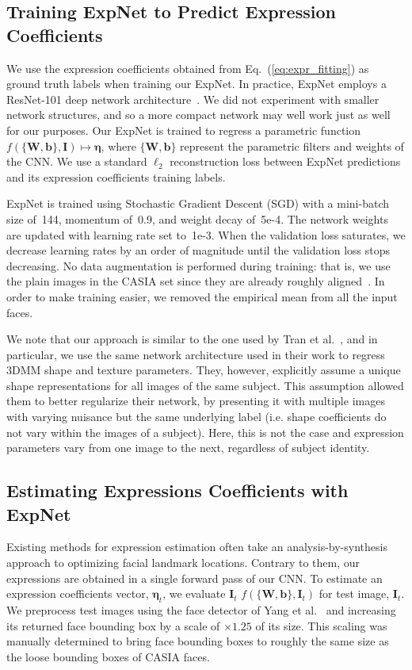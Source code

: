 \documentclass[a4paper, 10pt, conference]{ieeeconf}
\def\mbf#1{\mathbf{#1}}
\begin{document}
\subsection{Training ExpNet to Predict Expression Coefficients}\label{sec:training}
We use the expression coefficients obtained from Eq.~(\ref{eq:expr_fitting}) as ground truth labels when training our ExpNet. In practice, ExpNet employs a ResNet-101 deep network architecture~\cite{He_2016_CVPR}. We did not experiment with smaller network structures, and so a more compact network may well work just as well for our purposes. Our ExpNet is trained to regress a parametric function $f(\{\mbf{W},\mbf{b}\}, \mbf{I}) \mapsto \boldsymbol{\eta}$, where $\{\mbf{W},\mbf{b}\}$ represent the parametric filters and weights of the CNN. We use a standard $\ell_2$ reconstruction loss between ExpNet predictions and its expression coefficients training labels.

ExpNet is trained using Stochastic Gradient Descent (SGD) with a mini-batch size of~144, momentum of~0.9, and weight decay of~5e-4. The network weights are updated with learning rate set to~1e-3. When the validation loss saturates, we decrease learning rates by an order of magnitude until the validation loss stops decreasing. No data augmentation is performed during training: that is, we use the plain images in the CASIA set since they are already roughly aligned~\cite{yi2014learning}. In order to make training easier, we removed the empirical mean from all the input faces.

We note that our approach is similar to the one used by Tran et al.~\cite{tran16_3dmm_cnn}, and in particular, we use the same network architecture used in their work to regress 3DMM shape and texture parameters. They, however, explicitly assume a unique shape representations for all images of the same subject. This assumption allowed them to better regularize their network, by presenting it with multiple images with varying nuisance but the same underlying label (i.e. shape coefficients do not vary within the images of a subject). Here, this is not the case and expression parameters vary from one image to the next, regardless of subject identity.  



\subsection{Estimating Expressions Coefficients with ExpNet}\label{sec:predict}
Existing methods for expression estimation often take an analysis-by-synthesis approach to optimizing facial landmark locations. Contrary to them, our expressions are obtained in a single forward pass of our CNN. To estimate an expression coefficients vector, $\boldsymbol{\eta}_t$, we evaluate $\mbf{I}_t$ $f(\{\mbf{W},\mbf{b}\}, \mbf{I}_t)$ for test image, $\mbf{I}_t$. We preprocess test images using the face detector of Yang et al.~\cite{yang2016multi} and increasing its returned face bounding box by a scale of $\times 1.25$ of its size. This scaling was manually determined to bring face bounding boxes to roughly the same size as the loose bounding boxes of CASIA faces. 
\end{document}
